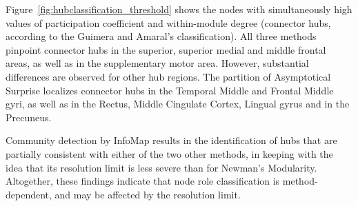Figure~\ref{fig:hubclassification_threshold} shows the nodes with simultaneously high values of participation coefficient and within-module degree (connector hubs, according to the Guimera and Amaral's classification).
All three methods pinpoint connector hubs in the superior, superior medial and middle frontal areas, as well as in the supplementary motor area.
However, substantial differences are observed for other hub regions.
The partition of Asymptotical Surprise localizes connector hubs in the Temporal Middle and Frontal Middle gyri, as well as in the Rectus, Middle Cingulate Cortex, Lingual gyrus and in the Precuneus.

Community detection by InfoMap results in the identification of hubs that are partially consistent with either of the two other methods, in keeping with the idea that its resolution limit is less severe than for Newman's Modularity.
Altogether, these findings indicate that node role classification is method-dependent, and may be affected by the resolution limit.

